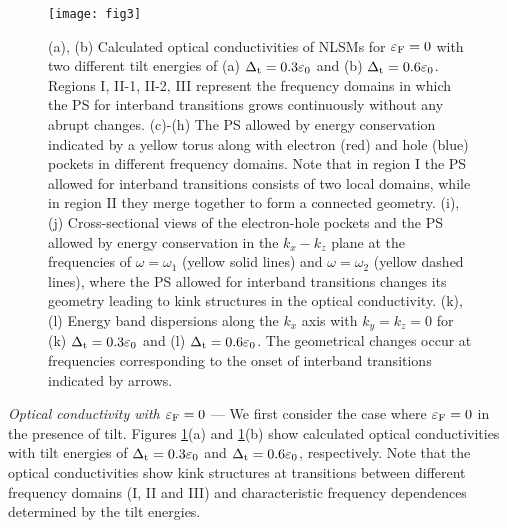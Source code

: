 \documentclass[aps,twocolumn,floatfix]{revtex4-1}
\begin{document}
\begin{figure}[!htb]
\texttt{[image: fig3]}
\caption{
(a), (b) Calculated optical conductivities of NLSMs for $\varepsilon_{\rm F}=0$ with two different tilt energies of (a) $\Delta_{\rm t}=0.3\varepsilon_0$ and (b) $\Delta_{\rm t}=0.6\varepsilon_0$. Regions I, II-1, II-2, III represent the frequency domains in which the PS for interband transitions grows continuously without any abrupt changes.
(c)-(h) The PS allowed by energy conservation indicated by a yellow torus along with electron (red) and hole (blue) pockets in different frequency domains. Note that in region I the PS allowed for interband transitions consists of two local domains, while in region II they merge together to form a connected geometry.
(i), (j) Cross-sectional views of the electron-hole pockets and the PS allowed by energy conservation in the $k_x-k_z$ plane at the frequencies of $\omega=\omega_1$ (yellow solid lines) and $\omega=\omega_2$ (yellow dashed lines), where the PS allowed for interband transitions changes its geometry leading to kink structures in the optical conductivity. (k), (l) Energy band dispersions along the $k_x$ axis with $k_y=k_z=0$ for (k) $\Delta_{\rm t}=0.3\varepsilon_0$ and (l) $\Delta_{\rm t}=0.6\varepsilon_0$. The geometrical changes occur at frequencies corresponding to the onset of interband transitions indicated by arrows.
}
\label{fig:optical_conductivity_tilt}
\end{figure}

{\em Optical conductivity with $\varepsilon_{\rm F}=0$} ---
We first consider the case where $\varepsilon_{\rm F}=0$ in the presence of tilt.
Figures \ref{fig:optical_conductivity_tilt}(a) and \ref{fig:optical_conductivity_tilt}(b) show calculated optical conductivities with tilt energies of $\Delta_{\rm t}=0.3\varepsilon_0$ and $\Delta_{\rm t}=0.6\varepsilon_0$, respectively. Note that the optical conductivities show kink structures at transitions between different frequency domains (I, II and III) and characteristic frequency dependences determined by the tilt energies.
\end{document}
